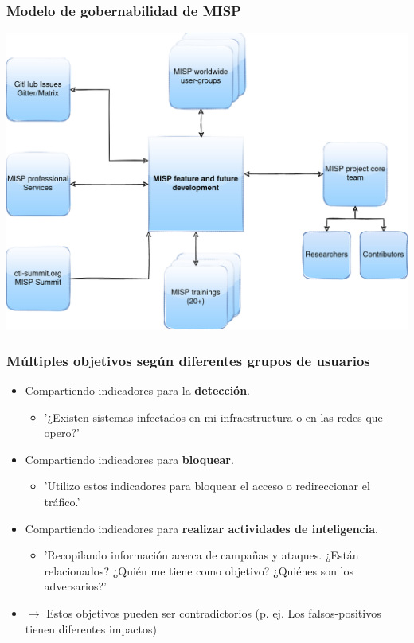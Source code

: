 \begin{frame}
\frametitle{Modelo de gobernabilidad de MISP}
\begin{center}
\includegraphics[scale=0.2]{governance.png}
\end{center}
\end{frame}

\begin{frame}
\frametitle{Múltiples objetivos según diferentes grupos de usuarios}
        \begin{itemize}
                \item Compartiendo indicadores para la {\bf detección}.
                        \begin{itemize}
                                \item '¿Existen sistemas infectados en mi infraestructura o en las redes que opero?'
                        \end{itemize}
                \item Compartiendo indicadores para {\bf bloquear}.
                        \begin{itemize}
                                \item 'Utilizo estos indicadores para bloquear el acceso o redireccionar el tráfico.'
                        \end{itemize}
                \item Compartiendo indicadores para {\bf realizar actividades de inteligencia}.
                        \begin{itemize}
                                \item 'Recopilando información acerca de campañas y ataques. ¿Están relacionados? ¿Quién me tiene como objetivo? ¿Quiénes son los adversarios?'
                        \end{itemize}
                \item $\rightarrow$ Estos objetivos pueden ser contradictorios (p. ej. Los falsos-positivos tienen diferentes impactos)
        \end{itemize}
\end{frame}


